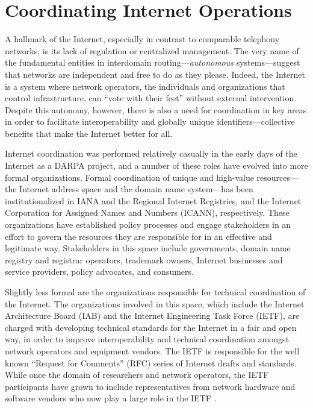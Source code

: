 \section{Coordinating Internet Operations}

A hallmark of the Internet, especially in contrast to comparable telephony
networks, is its lack of regulation or centralized management. The very name of
the fundamental entities in interdomain routing---\emph{autonomous}
systems---suggest that networks are independent and free to do as they please.
Indeed, the Internet is a system where network operators, the individuals and
organizations that control infrastructure, can ``vote with their feet'' without
external intervention. Despite this autonomy, however, there is also a need for
coordination in key areas in order to facilitate interoperability and globally
unique identifiers---collective benefits that make the Internet better for
all.

Internet coordination was performed relatively casually in the early days of
the Internet as a DARPA project, and a number of these roles have evolved into
more formal organizations. Formal coordination of unique and high-value
resources---the Internet address space and the domain name system---has been
institutionalized in IANA and the Regional Internet Registries, and the
Internet Corporation for Assigned Names and Numbers (ICANN), respectively.
These organizations have established policy processes and engage stakeholders
in an effort to govern the resources they are responsible for in an effective
and legitimate way. Stakeholders in this space include governments, domain name
registry and registrar operators, trademark owners, Internet businesses and
service providers, policy advocates, and consumers.

Slightly less formal are the organizations responsible for technical
coordination of the Internet. The organizations involved in this space, which
include the Internet Architecture Board (IAB) and the Internet Engineering Task
Force (IETF), are charged with developing technical standards for the Internet
in a fair and open way, in order to improve interoperability and technical
coordination amongst network operators and equipment vendors. The IETF is
responsible for the well known ``Request for Comments'' (RFC) series of Internet
drafts and standards. While once the domain of researchers and network
operators, the IETF participants have grown to include representatives from
network hardware and software vendors who now play a large role in the IETF
\cite{Li:2011vn}.

